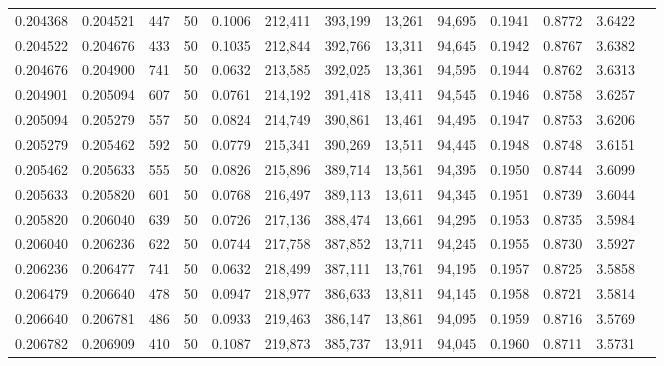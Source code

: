 \begin{tabular}{rrrrrrrrrrrrr}
0.204368 & 0.204521 &   447 &  50 &                                     0.1006 & 212,411 & 393,199 &  13,261 &  94,695 & 0.1941 & 0.8772 & 3.6422 \\
0.204522 & 0.204676 &   433 &  50 &                                     0.1035 & 212,844 & 392,766 &  13,311 &  94,645 & 0.1942 & 0.8767 & 3.6382 \\
0.204676 & 0.204900 &   741 &  50 &                                     0.0632 & 213,585 & 392,025 &  13,361 &  94,595 & 0.1944 & 0.8762 & 3.6313 \\
0.204901 & 0.205094 &   607 &  50 &                                     0.0761 & 214,192 & 391,418 &  13,411 &  94,545 & 0.1946 & 0.8758 & 3.6257 \\
0.205094 & 0.205279 &   557 &  50 &                                     0.0824 & 214,749 & 390,861 &  13,461 &  94,495 & 0.1947 & 0.8753 & 3.6206 \\
0.205279 & 0.205462 &   592 &  50 &                                     0.0779 & 215,341 & 390,269 &  13,511 &  94,445 & 0.1948 & 0.8748 & 3.6151 \\
0.205462 & 0.205633 &   555 &  50 &                                     0.0826 & 215,896 & 389,714 &  13,561 &  94,395 & 0.1950 & 0.8744 & 3.6099 \\
0.205633 & 0.205820 &   601 &  50 &                                     0.0768 & 216,497 & 389,113 &  13,611 &  94,345 & 0.1951 & 0.8739 & 3.6044 \\
0.205820 & 0.206040 &   639 &  50 &                                     0.0726 & 217,136 & 388,474 &  13,661 &  94,295 & 0.1953 & 0.8735 & 3.5984 \\
0.206040 & 0.206236 &   622 &  50 &                                     0.0744 & 217,758 & 387,852 &  13,711 &  94,245 & 0.1955 & 0.8730 & 3.5927 \\
0.206236 & 0.206477 &   741 &  50 &                                     0.0632 & 218,499 & 387,111 &  13,761 &  94,195 & 0.1957 & 0.8725 & 3.5858 \\
0.206479 & 0.206640 &   478 &  50 &                                     0.0947 & 218,977 & 386,633 &  13,811 &  94,145 & 0.1958 & 0.8721 & 3.5814 \\
0.206640 & 0.206781 &   486 &  50 &                                     0.0933 & 219,463 & 386,147 &  13,861 &  94,095 & 0.1959 & 0.8716 & 3.5769 \\
0.206782 & 0.206909 &   410 &  50 &                                     0.1087 & 219,873 & 385,737 &  13,911 &  94,045 & 0.1960 & 0.8711 & 3.5731 \\

\end{tabular}
